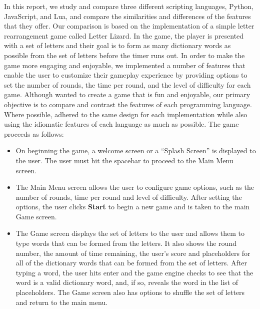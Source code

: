 
In this report, we study and compare three different scripting languages, Python,
JavaScript, and Lua, and compare the similarities and differences of the features that
they offer. Our comparison is based on the implementation of a simple letter rearrangement game
called Letter Lizard. In the game, the player is presented with a set of letters and 
their goal is to form as many dictionary words as possible from the set of letters
before the timer runs out. In order to make the game
more engaging and enjoyable, we implemented a number of features that enable the user to customize
their gameplay experience by providing options to set the number of rounds, the time per round, 
and the level of difficulty for each
game. Although wanted to create a game that is fun and enjoyable, our primary objective is to
compare and contrast the features of each programming language. Where possible, adhered to the same
design for each implementation while also using the idiomatic features of each language as much as 
possible. The game proceeds as follows:

\begin{itemize}
    \item On beginning the game, a welcome screen or a ``Splash Screen'' is displayed
    to the user. The user must hit the spacebar to proceed to the Main Menu screen.
    \item The Main Menu screen allows the user to configure game options, such as the
    number of rounds, time per round and level of difficulty. After setting the options, the
    user clicks \textbf{Start} to begin a new game and is taken to the main Game screen.
    \item The Game screen displays the set of letters to the user and allows them to type
    words that can be formed from the letters. It also shows the round number, the amount of
    time remaining, the user's score and placeholders for all of the dictionary words that
    can be formed from the set of letters. After typing a word, the user hits
    enter and the game engine checks to see that the word is a valid dictionary word, and, if so,
    reveals the word in the list of placeholders. The Game screen also has options to shuffle
    the set of letters and return to the main menu.
\end{itemize}


